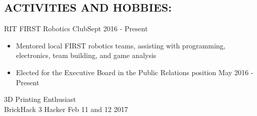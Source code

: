 \documentclass[line,margin]{res}
\begin{document}
\begin{resume}
\section{ACTIVITIES AND HOBBIES:}


	RIT FIRST Robotics Club\hfill Sept 2016 - Present
	\begin{itemize}
		\item Mentored local FIRST robotics teams, assisting with programming, electronics, team building, and game analysis
		\item Elected for the Executive Board in the Public Relations position \hfill May 2016 - Present
	\end{itemize}
\vspace{-5pt}

	3D Printing Enthusiast \\
	BrickHack 3 Hacker \hfill Feb 11 and 12 2017

%
%
%
%
\end{resume}
\end{document}
